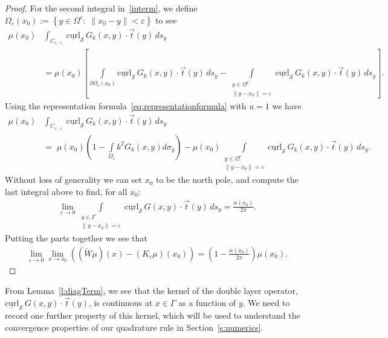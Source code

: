 \documentclass[final]{siamltex}
\renewcommand{\S} {\mathcal{S}}
\newcommand{\e}{\varepsilon}
\begin{document}
\begin{proof}
For the second integral in~\eqref{interm},  we define
$\Omega_{\varepsilon}(x_{0}):=\left\{ y\in\Omega^{c}:\; \|x_0-y\|<
\varepsilon \right\}$ to see
\begin{align*}
  \mu(x_0)&\int_{C_{\e,<}} \underline{\mbox{curl}}_{\S}\,
    G_k(x,y)\cdot\vec{t}(y)\,ds_{y} \\
  &= \mu(x_0) \left[ \int\limits_{\partial \Omega_{\varepsilon}(x_0)} 
  \underline{\mbox{curl}}_{\S}\,G_k(x,y)\cdot\vec{t}(y)\,ds_{y} - 
  \int\limits_{\substack{y \in \Omega^{c} \\ \|y - x_{0}\| =
  \varepsilon}}
\underline{\mbox{curl}}_{\S}\,G_k(x,y)\cdot\vec{t}(y)\,ds_{y} \right].
\end{align*}
Using the representation formula~\eqref{eq:representationformula} with
$u=1$ we have
\begin{align*}
  \mu(x_0)&\int_{C_{\e,<}} \underline{\mbox{curl}}_{\S}\,
    G_k(x,y)\cdot\vec{t}(y)\,ds_{y} \\
    &=\;\mu(x_0) \left(1 - \int\limits_{\Omega_{\varepsilon}} 
    k^2 G_k(x,y) d\sigma_{y}\right) 
   - \mu(x_0) \int\limits_{\substack{y \in \Omega^{c} \\ \|y - x_{0}\| =
  \varepsilon}}
\underline{\mbox{curl}}_{\S}\,G_k(x,y)\cdot\vec{t}(y)\,ds_{y}.
\end{align*}
Without loss of generality we can set $x_0$ to be the north pole, and
compute the last integral above  to find, for all $x_{0}$: 
\begin{align*}
  \lim_{\varepsilon\rightarrow 0}
  \int\limits_{\substack{y \in \Gamma \\ \|y - x_{0}\| = \varepsilon}}
  \underline{\mbox{curl}}_{\S}\,G(x,y)\cdot\vec{t}(y)\,ds_{y}
  =\frac{\alpha(x_0)}{2\pi}.
\end{align*}
Putting the parts together we see that
\begin{align*}
  \lim_{\varepsilon\rightarrow 0} \lim_{x\rightarrow x_0}
  \left((\widetilde{W}\mu)(x)-(K_{\varepsilon}\mu)(x_0)\right)
  =\left(1-\frac{\alpha(x_0)}{2\pi}\right)\mu(x_0).
\end{align*}
\end{proof}

From Lemma~\ref{l:diagTerm}, we see that the kernel of the double layer
operator, $\underline{\mbox{curl}}_{\S}\,G(x,y)\cdot\vec{t}(y)$, is
continuous at $x \in \Gamma$ as a function of $y$.  We need to record
one further property of this kernel, which will be used to understand
the convergence properties of our quadrature rule in
Section~\ref{s:numerics}. 
\end{document}
